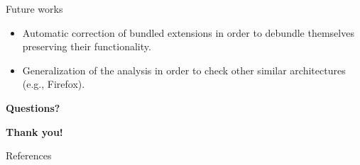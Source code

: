 \documentclass[11pt]{beamer}
\begin{document}
\begin{frame}{Future works}
\begin{itemize}
\item Automatic correction of bundled extensions in order to debundle themselves preserving their functionality.
\item Generalization of the analysis in order to check other similar architectures (e.g., Firefox).
\end{itemize}
\end{frame}

\begin{frame}
\begin{center}
{\Large \textbf{Questions?}}
\end{center}
\end{frame}

\begin{frame}
\begin{center}
{\Large \textbf{Thank you!}}
\end{center}
\end{frame}

\begin{frame}{References}
\begin{tiny}


\end{tiny}
\end{frame}
\end{document}
